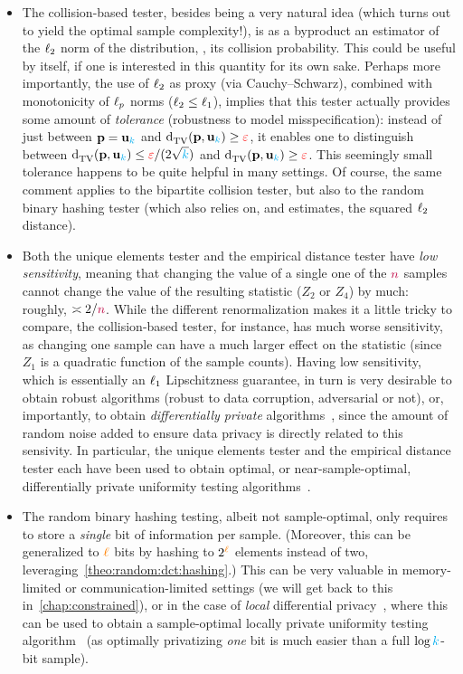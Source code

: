 \begin{itemize}
  \item The collision-based tester, besides being a very natural idea (which turns out to yield the optimal sample complexity!), is as a byproduct an estimator of the $\lp[2]$ norm of the distribution, \ie, its collision probability. This could be useful by itself, if one is interested in this quantity for its own sake. Perhaps more importantly, the use of $\lp[2]$ as proxy (via Cauchy--Schwarz), combined with monotonicity of $\lp[p]$ norms ($\lp[2]\leq \lp[1]$), implies that this tester actually provides some amount of \emph{tolerance} (robustness to model misspecification): instead of just between $\p=\uniform_\ab$ and $\totalvardist{\p}{\uniform_\ab} \geq \dst$, it enables one to distinguish between $\totalvardist{\p}{\uniform_\ab} \leq \dst/(2\sqrt{\ab})$ and $\totalvardist{\p}{\uniform_\ab} \geq \dst$. This seemingly small tolerance happens to be quite helpful in many settings. Of course, the same comment applies to the bipartite collision tester, but also to the random binary hashing tester (which also relies on, and estimates, the squared $\lp[2]$ distance).
  \item Both the unique elements tester and the empirical distance tester have \emph{low sensitivity}, meaning that changing the value of a single one of the $\ns$ samples cannot change the value of the resulting statistic ($Z_2$ or $Z_4$) by much: roughly, $\asymp 2/\ns$. While the different renormalization makes it a little tricky to compare, the collision-based tester, for instance, has much worse sensitivity, as changing one sample can have a much larger effect on the statistic (since $Z_1$ is a quadratic function of the sample counts). Having low sensitivity, which is essentially an $\lp[1]$ Lipschitzness guarantee, in turn is very desirable to obtain robust algorithms (\ie robust to data corruption, adversarial or not), or, importantly, to obtain \emph{differentially private} algorithms~\citep{DworkMNS06}, since the amount of random noise added to ensure data privacy is directly related to this sensivity. In particular, the unique elements tester and the empirical distance tester each have been used to obtain optimal, or near-sample-optimal, differentially private uniformity testing algorithms~\citep{AcharyaSZ18,AliakbarpourDR18}.
  \item The random binary hashing testing, albeit not sample-optimal, only requires to store a \emph{single} bit of information per sample. (Moreover, this can be generalized to $\numbits$ bits by hashing to $2^\numbits$ elements instead of two, leveraging~\cref{theo:random:dct:hashing}.) This can be very valuable in memory-limited or communication-limited settings (we will get back to this in~\cref{chap:constrained}), or in the case of \emph{local} differential privacy~\citep{KLNRS:11}, where this can be used to obtain a sample-optimal locally private uniformity testing algorithm~\citep{AcharyaCFST21} (as optimally privatizing \emph{one} bit is much easier than a full $\log\ab$-bit sample).

\end{itemize}
